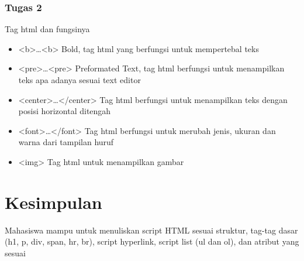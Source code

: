 \documentclass[a4paper,12pt]{article}
\begin{document}
\subsubsection{Tugas 2}
Tag html dan fungsinya\\
\begin{itemize}
    \item <b>…<b> 	Bold, tag html yang berfungsi untuk mempertebal teks
    \item <pre>…<pre> 	Preformated Text, tag html berfungsi untuk menampilkan teks apa adanya sesuai text editor
    \item <center>…</center> 	Tag html berfungsi untuk menampilkan teks dengan posisi horizontal ditengah
    \item <font>…</font> 	Tag html berfungsi untuk merubah jenis, ukuran dan warna dari tampilan huruf
    \item <img> 	Tag html untuk menampilkan gambar
\end{itemize}

\section{Kesimpulan}
Mahasiswa mampu untuk menuliskan script HTML sesuai struktur, tag-tag dasar (h1, p, div, span, hr, br), script hyperlink, script list (ul dan ol), dan atribut yang sesuai
\end{document}

